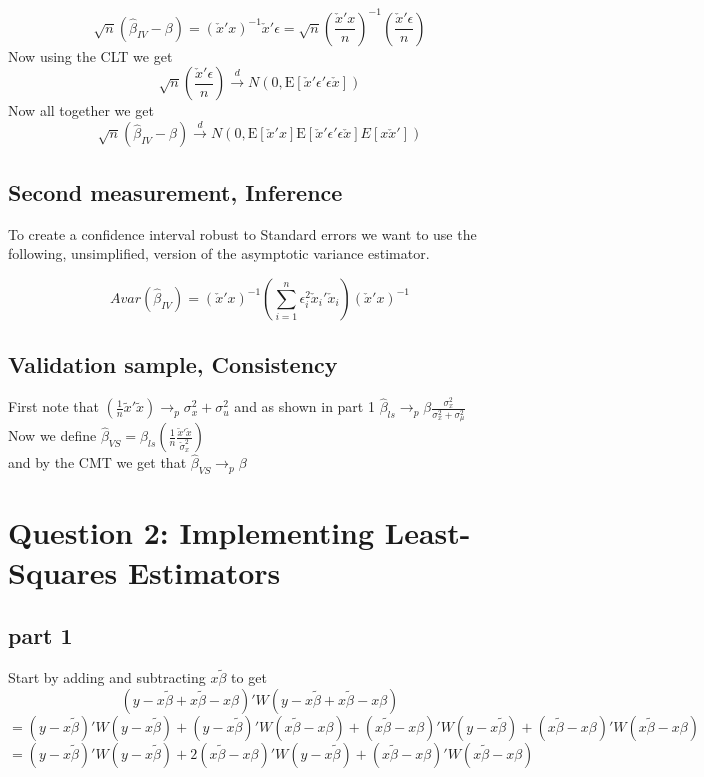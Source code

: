 \documentclass[11pt]{article}
\newcommand{\plim}{\rightarrow_{p}}
\newcommand{\E}{\mathrm{E}}
\begin{document}
$$\sqrt{n}(\hat{\beta}_{IV}-\beta) = (\check{x}'x)^{-1}\check{x}'\epsilon = \sqrt{n}\left(\frac{\check{x}'x}{n}\right)^{-1}\left(\frac{\check{x}'\epsilon}{n}\right)$$
Now using the CLT we get 
$$\sqrt{n}\left(\frac{\check{x}'\epsilon}{n}\right) \xrightarrow{d} N(0,\E[\check{x}'\epsilon'\epsilon\check{x}])$$
Now all together we get 
$$\sqrt{n}(\hat{\beta}_{IV}-\beta) \xrightarrow{d} N(0,\E[\check{x}'x]\E[\check{x}'\epsilon'\epsilon\check{x}]E[x\check{x}'])$$

\subsection{Second measurement, Inference}
To create a confidence interval robust to Standard errors we want to use the following, unsimplified, version of the asymptotic variance estimator. 

$$Avar(\hat{\beta}_{IV}) = (\check{x}'x)^{-1}\left( \sum_{i=1}^{n}\epsilon_{i}^2 \check{x}_i' \check{x}_i \right) (\check{x}'x)^{-1}$$

\subsection{Validation sample, Consistency}

First note that $(\frac{1}{n}\tilde{x}'\tilde{x}) \plim \sigma_x^2 + \sigma_u^2$ and as shown in part 1 $\hat{\beta}_{ls} \plim \beta \frac{\sigma_{x}^2}{\sigma_{x}^2 + \sigma_{\mu}^2}$\\

Now we define $\hat{\beta}_{VS} = \hat{\beta}_{ls}\left(\frac{1}{n}\frac{\tilde{x}'\tilde{x}}{\check{\sigma}_x^2} \right)$ \\

and by the CMT we get that $\hat{\beta}_{VS} \plim \beta$





\section{Question 2: Implementing Least-Squares Estimators}

\subsection{part 1}

Start by adding and subtracting $x \tilde{\beta}$ to get 
$$ (y-x\tilde{\beta} + x\tilde{\beta} - x\beta)'W(y-x\tilde{\beta} + x\tilde{\beta} - x\beta) $$
$$ = (y-x\tilde{\beta})'W(y-x\tilde{\beta}) + (y-x\tilde{\beta})'W(x\tilde{\beta} - x\beta) + (x\tilde{\beta} - x\beta)'W(y-x\tilde{\beta}) + (x\tilde{\beta} - x\beta)'W(x\tilde{\beta} - x\beta)$$
$$ = (y-x\tilde{\beta})'W(y-x\tilde{\beta}) + 2(x\tilde{\beta} - x\beta)'W(y-x\tilde{\beta}) + (x\tilde{\beta} - x\beta)'W(x\tilde{\beta} - x\beta)$$
\end{document}
